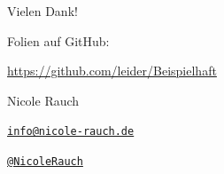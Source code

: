 {
\begin{frame}{}

\begin{center}
\Large
Vielen Dank!
\end{center}

        Folien auf GitHub:
        \vspace{-0.8em}
        \begin{center}
                \url{https://github.com/leider/Beispielhaft}
        \end{center}

        \begin{block}{Nicole Rauch}
        \begin{description}[Twitterxx]
                \item[E-Mail]  \href{mailto:info@nicole-rauch.de}{\texttt{info@nicole-rauch.de}}
                \item[Twitter] \href{http://twitter.com/NicoleRauch}{\texttt{@NicoleRauch}}
        \end{description}
        \end{block}
\end{frame}
}

%
%
